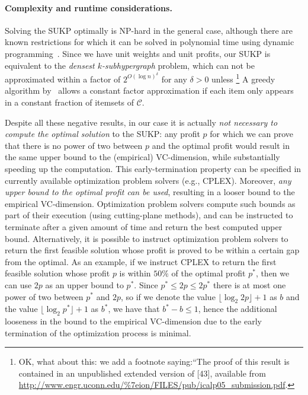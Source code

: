 \paragraph{Complexity and runtime considerations.} Solving the SUKP optimally
is NP-hard in the general case, although there are known restrictions for which
it can be solved in polynomial time using dynamic
programming~\citep{GoldschmidtNY94}. Since we have unit weights and unit
profits, our SUKP is equivalent to the \emph{densest $k$-subhypergraph} problem,
which can not be approximated within a factor of $2^{O(\log n)^\delta}$ for any
$\delta>0$ unless \footnote{OK, what about this: we add a footnote saying:``The proof of this
	result is contained in an unpublished extended version of [43], available
	from \url{http://www.engr.uconn.edu/\%7eion/FILES/pub/icalp05_submission.pdf}.}
 A greedy algorithm
by~\citet{Arulselvan14} allows a constant factor approximation if each item only
appears in a constant fraction of itemsets of $\mathcal{C}$.

Despite all these negative results, in our case it is actually \emph{not
necessary to compute the optimal solution} to the SUKP: any profit $p$ for which
we can prove that there is no power of two between $p$ and the optimal profit
would result in the same upper bound to the (empirical) VC-dimension, while
substantially speeding up the computation. This early-termination property can
be specified in currently available optimization problem solvers (e.g., CPLEX).
Moreover, \emph{any upper bound to the optimal profit can be used}, resulting in
a looser bound to the empirical VC-dimension. Optimization problem solvers
compute such bounds as part of their execution (using cutting-plane methods),
and can be instructed to terminate after a given amount of time and return the
best computed upper bound. Alternatively, it is possible to instruct
optimization problem solvers to return the first feasible solution whose profit
is proved to be within a certain gap from the optimal. As an example, if we
instruct CPLEX to return the first feasible solution whose profit $p$ is within
$50\%$ of the optimal profit $p^*$, then we can use $2p$ as an upper bound to
$p^*$. Since $p^*\le 2p\le 2p^*$ there is at most one power of two between $p^*$
and $2p$, so if we denote the value $\lfloor\log_2 2p\rfloor +1$ as $b$ and the
value $\lfloor\log_2 p^*\rfloor +1$ as $b^*$, we have that $b^*-b\le 1$, hence
the additional looseness in the bound to the empirical VC-dimension due to the
early termination of the optimization process is minimal.

